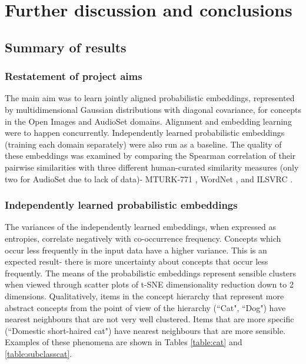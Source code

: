 \chapter{Further discussion and conclusions}

\section{Summary of results}

\subsection{Restatement of project aims}

The main aim was to learn jointly aligned probabilistic embeddings, represented by multidimensional Gaussian distributions with diagonal covariance, for concepts in the Open Images and AudioSet domains. Alignment and embedding learning were to happen concurrently. Independently learned probabilistic embeddings (training each domain separately) were also run as a baseline. The quality of these embeddings was examined by comparing the Spearman correlation of their pairwise similarities with three different human-curated similarity measures (only two for AudioSet due to lack of data)- MTURK-771 \cite{mturk771}, WordNet \cite{WordNet}, and ILSVRC \cite{RoadsLoveCVPR}. 

\subsection{Independently learned probabilistic embeddings}

The variances of the independently learned embeddings,  when expressed as entropies, correlate negatively with co-occurrence frequency. Concepts which occur less frequently in the input data have a higher variance. This is an expected result- there is more uncertainty about concepts that occur less frequently. The means of the probabilistic embeddings represent sensible clusters when viewed through scatter plots of t-SNE dimensionality reduction down to 2 dimensions. Qualitatively, items in the concept hierarchy that represent more abstract concepts from the point of view of the hierarchy (``Cat", ``Dog") have nearest neighbours that are not very well clustered. Items that are more specific (``Domestic short-haired cat")  have nearest neighbours that are more sensible. Examples of these phenomena are shown in Tables \ref{table:cat} and \ref{table:subclasscat}. 

